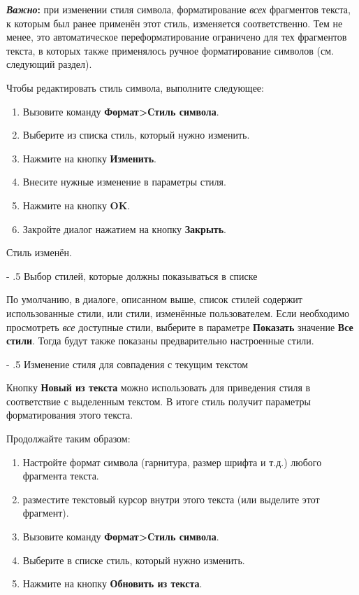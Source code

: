 ﻿\documentclass[a4paper,10pt]{article}
\makeatletter
\renewcommand\paragraph{%
   \@startsection{paragraph}{4}{0mm}%
      {-\baselineskip}%
      {.5\baselineskip}%
      {\normalfont\normalsize\bfseries}}
\makeatother
\begin{document}
\begin{mdframed}[backgroundcolor=blue!10]
\textbf{\textit{Важно}:} при изменении стиля символа, форматирование \textit{всех} фрагментов текста, к которым был ранее применён этот стиль, изменяется соответственно. Тем не менее, это автоматическое переформатирование ограничено для тех фрагментов текста, в которых также применялось ручное форматирование символов (см. следующий раздел).
\end{mdframed}
Чтобы редактировать стиль символа, выполните следующее:
\begin{enumerate}
 \item Вызовите команду \textbf{Формат>Стиль символа}.
 \item Выберите из списка стиль, который нужно изменить.
 \item Нажмите на кнопку \textbf{Изменить}.
 \item Внесите нужные изменение в параметры стиля.
 \item Нажмите на кнопку \textbf{OK}.
 \item Закройте диалог нажатием на кнопку \textbf{Закрыть}.
\end{enumerate}

Стиль изменён.

\paragraph{Выбор стилей, которые должны показываться в списке}

По умолчанию, в диалоге, описанном выше, список стилей содержит использованные стили, или стили, изменённые пользователем. Если необходимо просмотреть \textit{все} доступные стили, выберите в параметре \textbf{Показать} значение \textbf{Все стили}. Тогда будут также показаны предварительно настроенные стили.

\paragraph{Изменение стиля для совпадения с текущим текстом}

Кнопку \textbf{Новый из текста} можно использовать для приведения стиля в соответствие с выделенным текстом. В итоге стиль получит параметры форматирования этого текста.

Продолжайте таким образом:
\begin{enumerate}
 \item Настройте формат символа (гарнитура, размер шрифта и т.д.) любого фрагмента текста.
 \item разместите текстовый курсор внутри этого текста (или выделите этот фрагмент).
 \item Вызовите команду \textbf{Формат>Стиль символа}.
 \item Выберите в списке стиль, который нужно  изменить.
 \item Нажмите на кнопку \textbf{Обновить из текста}.
\end{enumerate}
\end{document}

